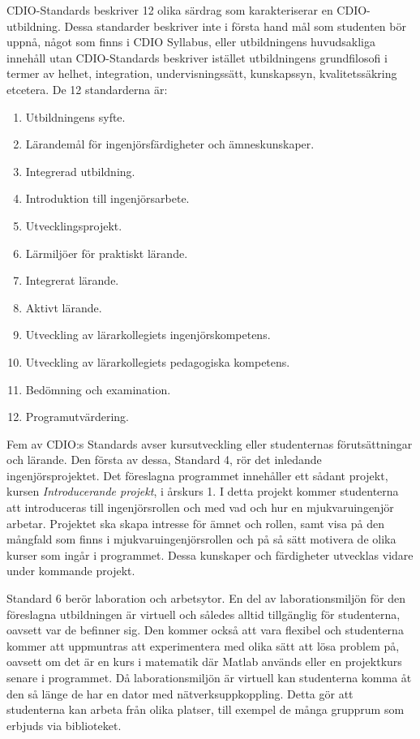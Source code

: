 CDIO-Standards beskriver 12 olika särdrag som karakteriserar en CDIO-utbildning. Dessa standarder beskriver inte i första hand mål som studenten bör uppnå, något som finns i CDIO Syllabus, eller utbildningens huvudsakliga innehåll utan CDIO-Standards beskriver istället utbildningens grundfilosofi i termer av helhet, integration, undervisningssätt, kunskapssyn, kvalitetssäkring etcetera. De 12 standarderna är:

\begin{enumerate}
\tightlist
\item Utbildningens syfte.
\item Lärandemål för ingenjörsfärdigheter och ämneskunskaper.
\item Integrerad utbildning.
\item Introduktion till ingenjörsarbete.
\item Utvecklingsprojekt.
\item Lärmiljöer för praktiskt lärande.
\item Integrerat lärande.
\item Aktivt lärande.
\item Utveckling av lärarkollegiets ingenjörskompetens.
\item Utveckling av lärarkollegiets pedagogiska kompetens.
\item Bedömning och examination.
\item Programutvärdering.
\end{enumerate}

Fem av CDIO:s Standards avser kursutveckling eller studenternas förutsättningar och lärande. Den första av dessa, Standard 4, rör det inledande ingenjörsprojektet. Det föreslagna programmet innehåller ett sådant projekt, kursen \emph{Introducerande projekt}, i årskurs 1. I detta projekt kommer studenterna att introduceras till ingenjörsrollen och med vad och hur en mjukvaruingenjör arbetar. Projektet ska skapa intresse för ämnet och rollen, samt visa på den mångfald som finns i mjukvaruingenjörsrollen och på så sätt motivera de olika kurser som ingår i programmet. Dessa kunskaper och färdigheter utvecklas vidare under kommande projekt.

Standard 6 berör laboration och arbetsytor. En del av laborationsmiljön för den föreslagna utbildningen är virtuell och således alltid tillgänglig för studenterna, oavsett var de befinner sig. Den kommer också att vara flexibel och studenterna kommer att uppmuntras att experimentera med olika sätt att lösa problem på, oavsett om det är en kurs i matematik där Matlab används eller en projektkurs senare i programmet. Då laborationsmiljön är virtuell kan studenterna komma åt den så länge de har en dator med nätverksuppkoppling. Detta gör att studenterna kan arbeta från olika platser, till exempel de många grupprum som erbjuds via biblioteket.

